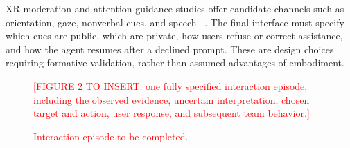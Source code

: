 XR moderation and attention-guidance studies offer candidate channels such as orientation, gaze, nonverbal cues, and speech ~\cite{p70,p34}. The final interface must specify which cues are public, which are private, how users refuse or correct assistance, and how the agent resumes after a declined prompt. These are design choices requiring formative validation, rather than assumed advantages of embodiment.

\begin{figure}[t]
\centering
\textcolor{red}{\parbox{0.90\linewidth}{[FIGURE 2 TO INSERT: one fully specified interaction episode, including the observed evidence, uncertain interpretation, chosen target and action, user response, and subsequent team behavior.]}}
\par\rule{0pt}{18mm}
\caption{\textcolor{red}{Interaction episode to be completed.}}
\label{fig:interaction}
\end{figure}

